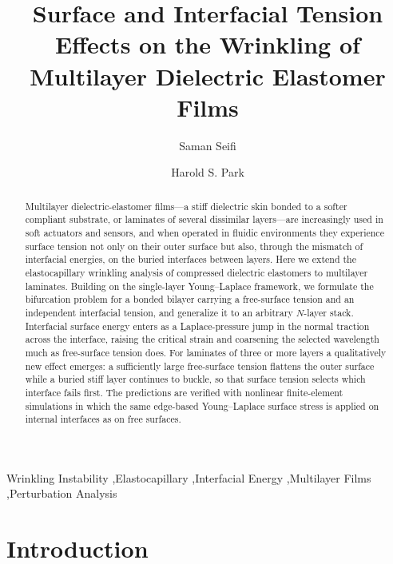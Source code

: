 \documentclass[final,3p,times]{elsarticle}
\begin{document}
\begin{frontmatter}

\title{Surface and Interfacial Tension Effects on the Wrinkling of Multilayer Dielectric Elastomer Films}

\author[ss]{Saman Seifi}
\address[ss]{Department of Mechanical Engineering, Boston University, Boston, MA 02215}
\author[hsp]{Harold S. Park}
\address[hsp]{Department of Mechanical Engineering, Boston University, Boston, MA 02215}

\begin{abstract}
Multilayer dielectric-elastomer films---a stiff dielectric skin bonded to a softer compliant substrate, or laminates of several dissimilar layers---are increasingly used in soft actuators and sensors, and when operated in fluidic environments they experience surface tension not only on their outer surface but also, through the mismatch of interfacial energies, on the buried interfaces between layers. Here we extend the elastocapillary wrinkling analysis of compressed dielectric elastomers to multilayer laminates. Building on the single-layer Young--Laplace framework, we formulate the bifurcation problem for a bonded bilayer carrying a free-surface tension and an independent interfacial tension, and generalize it to an arbitrary $N$-layer stack. Interfacial surface energy enters as a Laplace-pressure jump in the normal traction across the interface, raising the critical strain and coarsening the selected wavelength much as free-surface tension does. For laminates of three or more layers a qualitatively new effect emerges: a sufficiently large free-surface tension flattens the outer surface while a buried stiff layer continues to buckle, so that surface tension selects which interface fails first. The predictions are verified with nonlinear finite-element simulations in which the same edge-based Young--Laplace surface stress is applied on internal interfaces as on free surfaces.
\end{abstract}

\begin{keyword}
Wrinkling Instability \sep Elastocapillary \sep Interfacial Energy \sep Multilayer Films \sep Perturbation Analysis
\end{keyword}

\end{frontmatter}

\section{Introduction}
\end{document}

